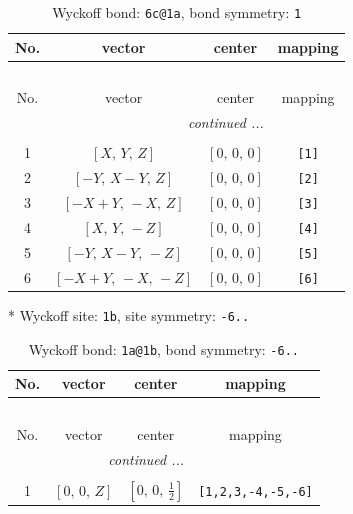 \documentclass[fleqn,8pt]{jsarticle}
\begin{document}
\renewcommand{\arraystretch}{1.2}
\begin{longtable}{cccc}
\caption{Wyckoff bond: {\tt 6c@1a}, bond symmetry: {\tt 1}}
 \\
 \hline \hline
No. & vector & center & mapping \\ \hline \endfirsthead

\multicolumn{3}{l}{\tablename\ \thetable{}} \\
 \hline \hline
No. & vector & center & mapping \\ \hline \endhead

 \hline \hline
\multicolumn{3}{r}{\footnotesize\it continued ...} \\ \endfoot

 \hline \hline
\multicolumn{3}{r}{} \\ \endlastfoot

1 & $\left[ X,\, Y,\, Z \right]$ & $\left[ 0,\, 0,\, 0 \right]$ & {\tt [1]} \\ \hline
2 & $\left[ - Y,\, X - Y,\, Z \right]$ & $\left[ 0,\, 0,\, 0 \right]$ & {\tt [2]} \\ \hline
3 & $\left[ - X + Y,\, - X,\, Z \right]$ & $\left[ 0,\, 0,\, 0 \right]$ & {\tt [3]} \\ \hline
4 & $\left[ X,\, Y,\, - Z \right]$ & $\left[ 0,\, 0,\, 0 \right]$ & {\tt [4]} \\ \hline
5 & $\left[ - Y,\, X - Y,\, - Z \right]$ & $\left[ 0,\, 0,\, 0 \right]$ & {\tt [5]} \\ \hline
6 & $\left[ - X + Y,\, - X,\, - Z \right]$ & $\left[ 0,\, 0,\, 0 \right]$ & {\tt [6]} \\
\end{longtable}
* Wyckoff site: {\tt 1b}, site symmetry: {\tt -6..}
\renewcommand{\arraystretch}{1.2}
\begin{longtable}{cccc}
\caption{Wyckoff bond: {\tt 1a@1b}, bond symmetry: {\tt -6..}}
 \\
 \hline \hline
No. & vector & center & mapping \\ \hline \endfirsthead

\multicolumn{3}{l}{\tablename\ \thetable{}} \\
 \hline \hline
No. & vector & center & mapping \\ \hline \endhead

 \hline \hline
\multicolumn{3}{r}{\footnotesize\it continued ...} \\ \endfoot

 \hline \hline
\multicolumn{3}{r}{} \\ \endlastfoot

1 & $\left[ 0,\, 0,\, Z \right]$ & $\left[ 0,\, 0,\, \frac{1}{2} \right]$ & {\tt [1,2,3,-4,-5,-6]} \\
\end{longtable}
\end{document}

